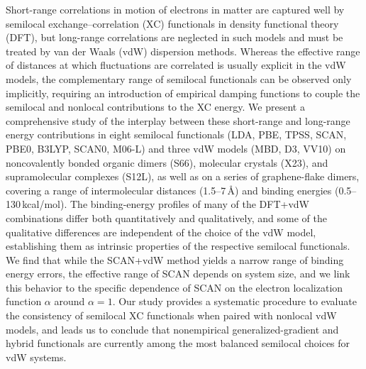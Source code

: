 Short-range correlations in motion of electrons in matter are captured well by semilocal exchange--correlation (XC) functionals in density functional theory (DFT), but long-range correlations are neglected in such models and must be treated by van der Waals (vdW) dispersion methods.
Whereas the effective range of distances at which fluctuations are correlated is usually explicit in the vdW models, the complementary range of semilocal functionals can be observed only implicitly, requiring an introduction of empirical damping functions to couple the semilocal and nonlocal contributions to the XC energy.
We present a comprehensive study of the interplay between these short-range and long-range energy contributions in eight semilocal functionals (LDA, PBE, TPSS, SCAN, PBE0, B3LYP, SCAN0, M06-L) and three vdW models (MBD, D3, VV10) on noncovalently bonded organic dimers (S66), molecular crystals (X23), and supramolecular complexes (S12L), as well as on a series of graphene-flake dimers, covering a range of intermolecular distances (1.5--7\,\AA) and binding energies (0.5--130\,kcal/mol).
The binding-energy profiles of many of the DFT+vdW combinations differ both quantitatively and qualitatively, and some of the qualitative differences are independent of the choice of the vdW model, establishing them as intrinsic properties of the respective semilocal functionals.
We find that while the SCAN+vdW method yields a narrow range of binding energy errors, the effective range of SCAN depends on system size, and we link this behavior to the specific dependence of SCAN on the electron localization function $\alpha$ around $\alpha=1$.
Our study provides a systematic procedure to evaluate the consistency of semilocal XC functionals when paired with nonlocal vdW models, and leads us to conclude that nonempirical generalized-gradient and hybrid functionals are currently among the most balanced semilocal choices for vdW systems.
